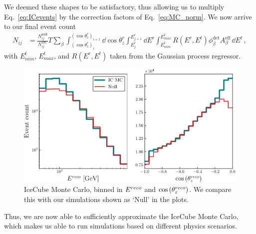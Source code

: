 We deemed these shapes to be satisfactory, thus allowing us to multiply Eq.~\ref{eq:ICevents} by the 
correction factors of Eq.~\ref{eq:MC_norm}. We now arrive to our final event count
\begin{align}\label{eq:Nth}
    N_{ij} &= \frac{N_{ij}^\text{null}}{N_{ij}^\text{MC}} T \sum_\beta \int_{(\cos{\theta_z^r})_i}^{(\cos{\theta_z^r})_{i+1}} \dd \cos{\theta^r_z} \int_{E^r_{j}}^{E^r_{j+1}} \dd E^r 
    \int_{E^t_{min}}^{E^t_{max}} R(E^r,E^t) \phi_\beta^\text{det}  A^\text{eff}_\beta\, \dd E^t
    \,,
\end{align}
with $E^t_{min}$, $E^t_{max}$, and $R(E^r,E^t)$ taken from the Gaussian process regressor.
\begin{figure}[ht]
    \begin{centering}
    \includegraphics[scale=0.8]{figures/IC_MC_norm.pdf}
    \caption{IceCube Monte Carlo, binned in $E^{reco}$ and $\cos{(\theta_z^{reco})}$. We compare this with our simulations shown as `Null' in the plots.}\label{fig:IC_MC_norm}
    \end{centering}
\end{figure} 
Thus, we are now able to sufficiently approximate the IceCube Monte Carlo, which makes us able to run simulations based on different physics scenarios.
% 
% 
% 